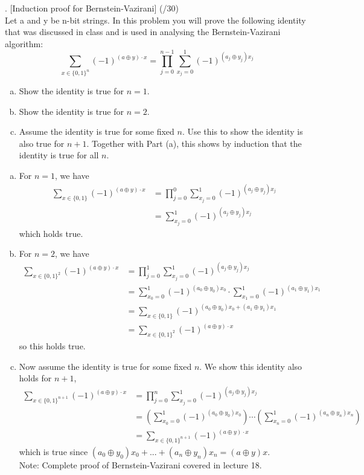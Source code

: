 \documentclass[11pt]{article}
\newenvironment{solution}{\begin{mdframed}[skipabove=\baselineskip,innertopmargin=\baselineskip,innerbottommargin=\baselineskip]
  }{\end{mdframed}}
\begin{document}
\vspace{3em}

. [Induction proof for Bernstein-Vazirani] (/30)
\\
Let a and y be n-bit strings. In this problem you will prove the following identity that was
discussed in class and is used in analysing the Bernstein-Vazirani algorithm:
$$\sum_{x\in\{0,1\}^n}(-1)^{(a\oplus y)\cdot x} = \prod_{j=0}^{n-1}\sum_{x_j=0}^1 (-1)^{(a_j\oplus y_j) x_j}$$

\begin{enumerate}[(a)] 
\item Show the identity is true for $n=1$.
\item Show the identity is true for $n=2$.
\item Assume the identity is true for some fixed $n$. Use this to show the identity is also true for $n + 1$. Together with Part (a), this shows by induction that the identity is true for all $n$.
\end{enumerate}

\begin{solution}
\begin{enumerate}[(a)]
    \item For $n=1$, we have \begin{align*}
        \sum_{x\in\{0,1\}}(-1)^{(a\oplus y)\cdot x} &= \prod_{j=0}^{0}\sum_{x_j=0}^1 (-1)^{(a_j\oplus y_j) x_j} \\
        &= \sum_{x_j=0}^1 (-1)^{(a_j\oplus y_j) x_j}
    \end{align*} which holds true.
    \item For $n=2$, we have \begin{align*}
        \sum_{x\in\{0,1\}^2}(-1)^{(a\oplus y)\cdot x} &= \prod_{j=0}^{1}\sum_{x_j=0}^1 (-1)^{(a_j\oplus y_j) x_j} \\
        &= \sum_{x_0=0}^1 (-1)^{(a_0\oplus y_0) x_0}\cdot\sum_{x_1=0}^1 (-1)^{(a_1\oplus y_1) x_1} \\
        &= \sum_{x\in\{0,1\}} (-1)^{(a_0\oplus y_0) x_0 + (a_1\oplus y_1) x_1} \\
        &= \sum_{x\in\{0,1\}^2}(-1)^{(a\oplus y)\cdot x}
    \end{align*} so this holds true.
    \item Now assume the identity is true for some fixed $n$. We show this identity also holds for $n+1$, \begin{align*}
        \sum_{x\in\{0,1\}^{n+1}}(-1)^{(a\oplus y)\cdot x} &= \prod_{j=0}^{n}\sum_{x_j=0}^1 (-1)^{(a_j\oplus y_j) x_j} \\
        &= \left(\sum_{x_0=0}^1 (-1)^{(a_0\oplus y_0) x_0}\right)\cdots\left(\sum_{x_n=0}^1 (-1)^{(a_n\oplus y_n) x_n}\right) \\
        &= \sum_{x\in\{0,1\}^{n+1}}(-1)^{(a\oplus y)\cdot x}
    \end{align*} which is true since $(a_0\oplus y_0)x_0 + ... +(a_n\oplus y_n)x_n = (a\oplus y)x$. \vspace{3em} \\ 
    Note: Complete proof of Bernstein-Vazirani covered in lecture 18.
\end{enumerate}
\end{solution}

 
\end{document}
